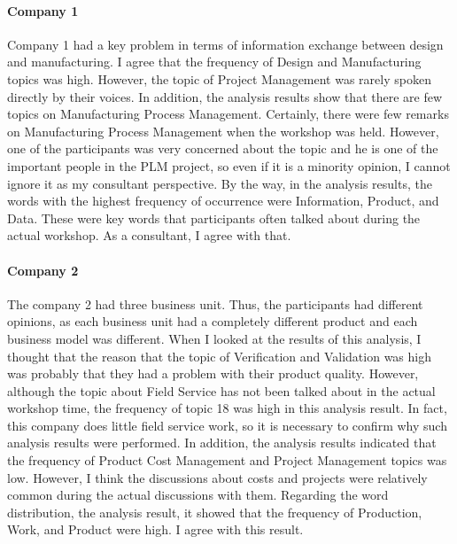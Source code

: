 \documentclass[senior]{IPSstyle}
\begin{document}
\paragraph{Company 1} Company 1 had a key problem in terms of information exchange between design and manufacturing. I agree that the frequency of Design and Manufacturing topics was high. However, the topic of Project Management was rarely spoken directly by their voices. In addition, the analysis results show that there are few topics on Manufacturing Process Management. Certainly, there were few remarks on Manufacturing Process Management when the workshop was held. However, one of the participants was very concerned about the topic and he is one of the important people in the PLM project, so even if it is a minority opinion, I cannot ignore it as my consultant perspective. By the way, in the analysis results, the words with the highest frequency of occurrence were Information, Product, and Data. These were key words that participants often talked about during the actual workshop. As a consultant, I agree with that.

\paragraph{Company 2} The company 2 had three business unit. Thus, the participants had different opinions, as each business unit had a completely different product and each business model was different. When I looked at the results of this analysis, I thought that the reason that the topic of Verification and Validation was high was probably that they had a problem with their product quality. However, although the topic about Field Service has not been talked about in the actual workshop time, the frequency of topic 18 was high in this analysis result. In fact, this company does little field service work, so it is necessary to confirm why such analysis results were performed. In addition, the analysis results indicated that the frequency of Product Cost Management and Project Management topics was low. However, I think the discussions about costs and projects were relatively common during the actual discussions with them. Regarding the word distribution, the analysis result, it showed that the frequency of Production, Work, and Product were high. I agree with this result.
\end{document}
